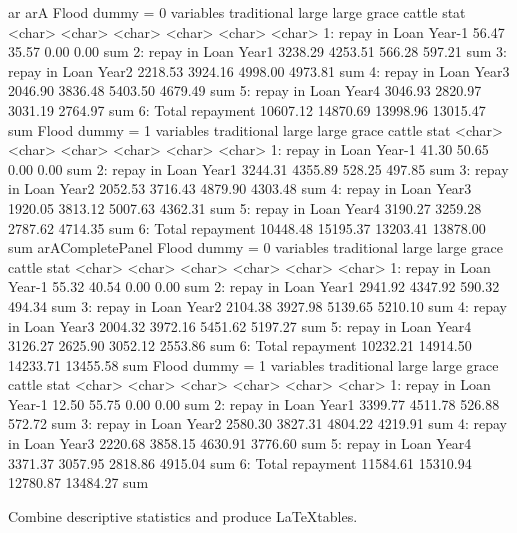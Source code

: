 \begin{Schunk}
\begin{Soutput}
ar 
arA 
Flood dummy = 0
              variables traditional    large large grace   cattle   stat
                 <char>      <char>   <char>      <char>   <char> <char>
1: repay in Loan Year-1       56.47    35.57        0.00     0.00    sum
2:  repay in Loan Year1     3238.29  4253.51      566.28   597.21    sum
3:  repay in Loan Year2     2218.53  3924.16     4998.00  4973.81    sum
4:  repay in Loan Year3     2046.90  3836.48     5403.50  4679.49    sum
5:  repay in Loan Year4     3046.93  2820.97     3031.19  2764.97    sum
6:      Total repayment    10607.12 14870.69    13998.96 13015.47    sum
Flood dummy = 1
              variables traditional    large large grace   cattle   stat
                 <char>      <char>   <char>      <char>   <char> <char>
1: repay in Loan Year-1       41.30    50.65        0.00     0.00    sum
2:  repay in Loan Year1     3244.31  4355.89      528.25   497.85    sum
3:  repay in Loan Year2     2052.53  3716.43     4879.90  4303.48    sum
4:  repay in Loan Year3     1920.05  3813.12     5007.63  4362.31    sum
5:  repay in Loan Year4     3190.27  3259.28     2787.62  4714.35    sum
6:      Total repayment    10448.48 15195.37    13203.41 13878.00    sum
arACompletePanel 
Flood dummy = 0
              variables traditional    large large grace   cattle   stat
                 <char>      <char>   <char>      <char>   <char> <char>
1: repay in Loan Year-1       55.32    40.54        0.00     0.00    sum
2:  repay in Loan Year1     2941.92  4347.92      590.32   494.34    sum
3:  repay in Loan Year2     2104.38  3927.98     5139.65  5210.10    sum
4:  repay in Loan Year3     2004.32  3972.16     5451.62  5197.27    sum
5:  repay in Loan Year4     3126.27  2625.90     3052.12  2553.86    sum
6:      Total repayment    10232.21 14914.50    14233.71 13455.58    sum
Flood dummy = 1
              variables traditional    large large grace   cattle   stat
                 <char>      <char>   <char>      <char>   <char> <char>
1: repay in Loan Year-1       12.50    55.75        0.00     0.00    sum
2:  repay in Loan Year1     3399.77  4511.78      526.88   572.72    sum
3:  repay in Loan Year2     2580.30  3827.31     4804.22  4219.91    sum
4:  repay in Loan Year3     2220.68  3858.15     4630.91  3776.60    sum
5:  repay in Loan Year4     3371.37  3057.95     2818.86  4915.04    sum
6:      Total repayment    11584.61 15310.94    12780.87 13484.27    sum
\end{Soutput}
\end{Schunk}
Combine descriptive statistics and produce \LaTeX  tables.


